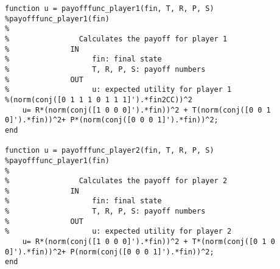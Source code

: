 \begin{lstlisting}
function u = payofffunc_player1(fin, T, R, P, S)
%payofffunc_player1(fin)
%   
%                Calculates the payoff for player 1
%              IN
%                   fin: final state
%                   T, R, P, S: payoff numbers
%              OUT
%                   u: expected utility for player 1
%(norm(conj([0 1 1 1 0 1 1 1]').*fin2CC))^2
    u= R*(norm(conj([1 0 0 0]').*fin))^2 + T(norm(conj([0 0 1 0]').*fin))^2+ P*(norm(conj([0 0 0 1]').*fin))^2;
end

function u = payofffunc_player2(fin, T, R, P, S)
%payofffunc_player1(fin)
%   
%                Calculates the payoff for player 2
%              IN
%                   fin: final state
%                   T, R, P, S: payoff numbers
%              OUT
%                   u: expected utility for player 2
    u= R*(norm(conj([1 0 0 0]').*fin))^2 + T*(norm(conj([0 1 0 0]').*fin))^2+ P(norm(conj([0 0 0 1]').*fin))^2;
end


\end{lstlisting}